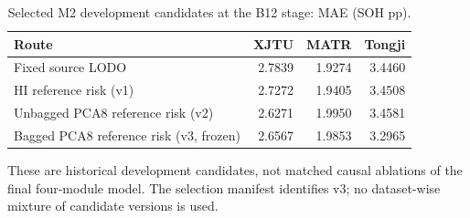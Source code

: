 \begin{table}[H]\centering
\caption{Selected M2 development candidates at the B12 stage: MAE (SOH pp).}\label{tab:sm2}
\papertablesize\setlength{\tabcolsep}{4pt}\renewcommand{\arraystretch}{1.15}
\begin{tabular}{lrrr}\toprule
Route & XJTU & MATR & Tongji \\ \midrule
Fixed source LODO & 2.7839 & 1.9274 & 3.4460 \\
HI reference risk (v1) & 2.7272 & 1.9405 & 3.4508 \\
Unbagged PCA8 reference risk (v2) & 2.6271 & 1.9950 & 3.4581 \\
Bagged PCA8 reference risk (v3, frozen) & 2.6567 & 1.9853 & 3.2965 \\
\bottomrule\end{tabular}
\par\smallskip\begin{minipage}{\linewidth}\papertablesize These are historical development candidates, not matched causal ablations of the final four-module model. The selection manifest identifies v3; no dataset-wise mixture of candidate versions is used.\end{minipage}
\end{table}
